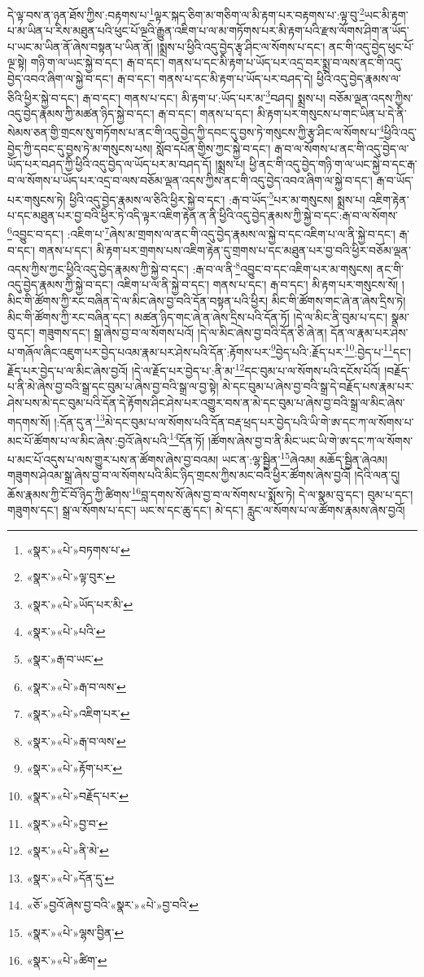 དེ་ལྟ་བས་ན་ཉན་ཐོས་ཀྱིས་:བརྟགས་པ་\footnote{«སྣར་»«པེ་»བཏགས་པ་}ལྟར་སྐད་ཅིག་མ་གཅིག་ལ་མི་རྟག་པར་བརྟགས་པ་:ལྟ་བུ་\footnote{«སྣར་»«པེ་»ལྟ་བུར་}ཡང་མི་རྟག་པ་མ་ཡིན་པ་རིས་མཐུན་པའི་ཕུང་པོ་ལྔའི་རྒྱུན་འཇིག་པ་ལ་མ་གཏོགས་པར་མི་རྟག་པའི་རྫས་ལོགས་ཤིག་ན་ཡོད་པ་ཡང་མ་ཡིན་ནོ་ཞེས་བསྟན་པ་ཡིན་ནོ། །སྨྲས་པ་ཕྱིའི་འདུ་བྱེད་རྩྭ་ཤིང་ལ་སོགས་པ་དང་། ནང་གི་འདུ་བྱེད་ཕུང་པོ་ལྔ་སྟེ། གཉི་ག་ལ་ཡང་སྐྱེ་བ་དང་། རྒ་བ་དང་། གནས་པ་དང་མི་རྟག་པ་ཡོད་པར་འདྲ་བར་སྨྲ་བ་ལས་ནང་གི་འདུ་བྱེད་འབའ་ཞིག་ལ་སྐྱེ་བ་དང་། རྒ་བ་དང་། གནས་པ་དང་མི་རྟག་པ་ཡོད་པར་བཤད་དེ། ཕྱིའི་འདུ་བྱེད་རྣམས་ལ་ཅིའི་ཕྱིར་སྐྱེ་བ་དང་། རྒ་བ་དང་། གནས་པ་དང་། མི་རྟག་པ་:ཡོད་པར་མ་\footnote{«སྣར་»«པེ་»ཡོད་པར་མི་}བཤད། སྨྲས་པ། བཅོམ་ལྡན་འདས་ཀྱིས་འདུ་བྱེད་རྣམས་ཀྱི་མཚན་ཉིད་སྐྱེ་བ་དང་། རྒ་བ་དང་། གནས་པ་དང་། མི་རྟག་པར་གསུངས་པ་གང་ཡིན་པ་དེ་ནི་སེམས་ཅན་གྱི་གྲངས་སུ་གཏོགས་པ་ནང་གི་འདུ་བྱེད་ཀྱི་དབང་དུ་བྱས་ཏེ་གསུངས་ཀྱི་རྩྭ་ཤིང་ལ་སོགས་པ་\footnote{«སྣར་»«པེ་»པའི་}ཕྱིའི་འདུ་བྱེད་ཀྱི་དབང་དུ་བྱས་ཏེ་མ་གསུངས་པས། སློབ་དཔོན་གྱིས་ཀྱང་སྐྱེ་བ་དང་། རྒ་བ་ལ་སོགས་པ་ནང་གི་འདུ་བྱེད་ལ་ཡོད་པར་བཤད་ཀྱི་ཕྱིའི་འདུ་བྱེད་ལ་ཡོད་པར་མ་བཤད་དོ། །སྨྲས་པ། ཕྱི་ནང་གི་འདུ་བྱེད་གཉི་ག་ལ་ཡང་སྐྱེ་བ་དང་རྒ་བ་ལ་སོགས་པ་ཡོད་པར་འདྲ་བ་ལས་བཅོམ་ལྡན་འདས་ཀྱིས་ནང་གི་འདུ་བྱེད་འབའ་ཞིག་ལ་སྐྱེ་བ་དང་། རྒ་བ་ཡོད་པར་གསུངས་ཏེ། ཕྱིའི་འདུ་བྱེད་རྣམས་ལ་ཅིའི་ཕྱིར་སྐྱེ་བ་དང་། :རྒ་བ་ཡོད་\footnote{«སྣར་»རྒ་བ་ཡང་}པར་མ་གསུངས། སྨྲས་པ། འཇིག་རྟེན་པ་དང་མཐུན་པར་བྱ་བའི་ཕྱིར་ཏེ་འདི་ལྟར་འཇིག་རྟེན་ན་ནི་ཕྱིའི་འདུ་བྱེད་རྣམས་ཀྱི་སྐྱེ་བ་དང་:རྒ་བ་ལ་སོགས་\footnote{«སྣར་»«པེ་»རྒ་བ་ལས་}འབྱུང་བ་དང་། :འཇིག་པ་\footnote{«སྣར་»«པེ་»འཇིག་པར་}ཞེས་མ་གྲགས་ལ་ནང་གི་འདུ་བྱེད་རྣམས་ལ་སྐྱེ་བ་དང་འཇིག་པ་ལ་ནི་སྐྱེ་བ་དང་། རྒ་བ་དང་། གནས་པ་དང་། མི་རྟག་པར་གྲགས་པས་འཇིག་རྟེན་དུ་གྲགས་པ་དང་མཐུན་པར་བྱ་བའི་ཕྱིར་བཅོམ་ལྡན་འདས་ཀྱིས་ཀྱང་ཕྱིའི་འདུ་བྱེད་རྣམས་ཀྱི་སྐྱེ་བ་དང་། :རྒ་བ་ལ་ནི་\footnote{«སྣར་»«པེ་»རྒ་བ་ལས་}འབྱུང་བ་དང་འཇིག་པར་མ་གསུངས། ནང་གི་འདུ་བྱེད་རྣམས་ཀྱི་སྐྱེ་བ་དང་། འཇིག་པ་ལ་ནི་སྐྱེ་བ་དང་། གནས་པ་དང་། རྒ་བ་དང་། མི་རྟག་པར་གསུངས་སོ། །མིང་གི་ཚོགས་ཀྱི་རང་བཞིན་དེ་ལ་མིང་ཞེས་བྱ་བའི་དོན་བསྟན་པའི་ཕྱིར། མིང་གི་ཚོགས་གང་ཞེ་ན་ཞེས་དྲིས་ཏེ། མིང་གི་ཚོགས་ཀྱི་རང་བཞིན་དང་། མཚན་ཉིད་གང་ཞེ་ན་ཞེས་དྲིས་པའི་དོན་ཏོ། །དེ་ལ་མིང་ནི་བུམ་པ་དང་། སྣམ་བུ་དང་། གཟུགས་དང་། སྒྲ་ཞེས་བྱ་བ་ལ་སོགས་པའོ། །དེ་ལ་མིང་ཞེས་བྱ་བའི་དོན་ཅི་ཞེ་ན། དོན་ལ་རྣམ་པར་ཤེས་པ་གཞོལ་ཞིང་འཇུག་པར་བྱེད་པའམ་རྣམ་པར་ཤེས་པའི་དོན་:རྟོགས་པར་\footnote{«སྣར་»«པེ་»རྟོག་པར་}བྱེད་པའི་:རྗོད་པར་\footnote{«སྣར་»«པེ་»བརྗོད་པར་}:བྱེད་པ་\footnote{«སྣར་»«པེ་»བྱ་བ་}དང་། རྗོད་པར་བྱེད་པ་ལ་མིང་ཞེས་བྱའོ། །དེ་ལ་རྗོད་པར་བྱེད་པ་:ནི་མ་\footnote{«སྣར་»«པེ་»ནི་མེ་}དང་བུམ་པ་ལ་སོགས་པའི་དངོས་པོའོ། །བརྗོད་པ་ནི་མེ་ཞེས་བྱ་བའི་སྒྲ་དང་བུམ་པ་ཞེས་བྱ་བའི་སྒྲ་ལ་བྱ་སྟེ། མེ་དང་བུམ་པ་ཞེས་བྱ་བའི་སྒྲ་དེ་བརྗོད་པས་རྣམ་པར་ཤེས་པས་མེ་དང་བུམ་པའི་དོན་དེ་རྟོགས་ཤིང་ཤེས་པར་འགྱུར་བས་ན་མེ་དང་བུམ་པ་ཞེས་བྱ་བའི་སྒྲ་ལ་མིང་ཞེས་གདགས་སོ། །:དོན་དུ་ན་\footnote{«སྣར་»«པེ་»དོན་དུ་}མེ་དང་བུམ་པ་ལ་སོགས་པའི་དོན་བརྡ་ཕྲད་པར་བྱེད་པའི་ཡི་གེ་ཨ་དང་ཀ་ལ་སོགས་པ་མང་པོ་ཚོགས་པ་ལ་མིང་ཞེས་:བྱའོ་ཞེས་པའི་\footnote{«ཅོ་»བྱའོ་ཞེས་བྱ་བའི་«སྣར་»«པེ་»བྱ་བའི་}དོན་ཏོ། །ཚོགས་ཞེས་བྱ་བ་ནི་མིང་ཡང་ཡི་གེ་ཨ་དང་ཀ་ལ་སོགས་པ་མང་པོ་འདུས་པ་ལས་གྱུར་པས་ན་ཚོགས་ཞེས་བྱ་བའམ། ཡང་ན་:ལྷ་སྦྱིན་\footnote{«སྣར་»«པེ་»ལྷས་བྱིན་}ཞེའམ། མཆོད་སྦྱིན་ཞེའམ། གཟུགས་ཤེའམ་སྒྲ་ཞེས་བྱ་བ་ལ་སོགས་པའི་མིང་ཉིད་གྲངས་ཀྱིས་མང་བའི་ཕྱིར་ཚོགས་ཞེས་བྱའོ། །དེའི་ལན་དུ། ཆོས་རྣམས་ཀྱི་ངོ་བོ་ཉིད་ཀྱི་ཚིགས་\footnote{«སྣར་»«པེ་»ཚིག་}བླ་དགས་སོ་ཞེས་བྱ་བ་ལ་སོགས་པ་སྨོས་ཏེ། དེ་ལ་སྣམ་བུ་དང་། བུམ་པ་དང་། གཟུགས་དང་། སྒྲ་ལ་སོགས་པ་དང་། ཡང་ས་དང་ཆུ་དང་། མེ་དང་། རླུང་ལ་སོགས་པ་ལ་ཚོགས་རྣམས་ཞེས་བྱའོ། 